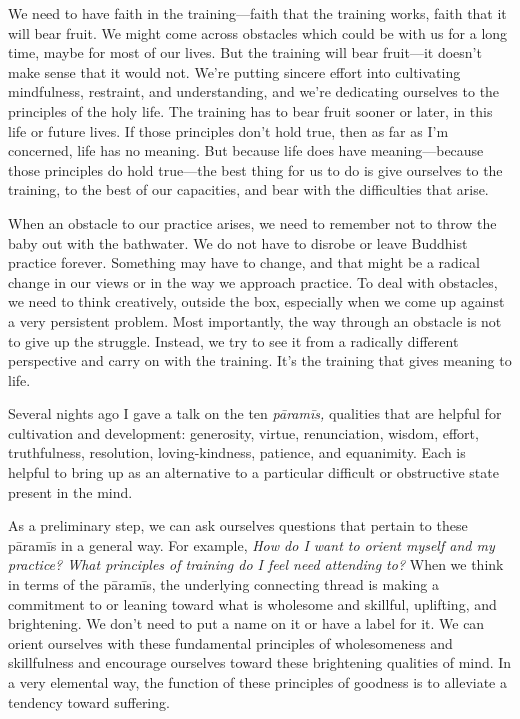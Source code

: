We need to have faith in the training---faith that the training works, 
faith that it will bear fruit. We might come across obstacles which 
could be with us for a long time, maybe for most of our lives. But the 
training will bear fruit---it doesn't make sense that it would not. 
We're putting sincere effort into cultivating mindfulness, restraint, 
and understanding, and we're dedicating ourselves to the principles of 
the holy life. The training has to bear fruit sooner or later, in this 
life or future lives. If those principles don't hold true, then as far 
as I'm concerned, life has no meaning. But because life does have 
meaning---because those principles do hold true---the best thing for us 
to do is give ourselves to the training, to the best of our capacities, 
and bear with the difficulties that arise.

When an obstacle to our practice arises, we need to remember not to 
throw the baby out with the bathwater. We do not have to disrobe or 
leave Buddhist practice forever. Something may have to change, and that 
might be a radical change in our views or in the way we approach 
practice. To deal with obstacles, we need to think creatively, outside 
the box, especially when we come up against a very persistent problem. 
Most importantly, the way through an obstacle is not to give up the 
struggle. Instead, we try to see it from a radically different 
perspective and carry on with the training. It's the training that 
gives meaning to life.


Several nights ago I gave a talk on the ten \emph{pāramīs,} qualities 
that are helpful for cultivation and development: generosity, virtue, 
renunciation, wisdom, effort, truthfulness, resolution, 
loving-kindness, patience, and equanimity. Each is helpful to bring up 
as an alternative to a particular difficult or obstructive state 
present in the mind.

As a preliminary step, we can ask ourselves questions that pertain to 
these pāramīs in a general way. For example, \emph{How do I want to 
orient myself and my practice? What principles of training do I feel 
need attending to?} When we think in terms of the pāramīs, the 
underlying connecting thread is making a commitment to or leaning 
toward what is wholesome and skillful, uplifting, and brightening. We 
don't need to put a name on it or have a label for it. We can orient 
ourselves with these fundamental principles of wholesomeness and 
skillfulness and encourage ourselves toward these brightening qualities 
of mind. In a very elemental way, the function of these principles of 
goodness is to alleviate a tendency toward suffering.

